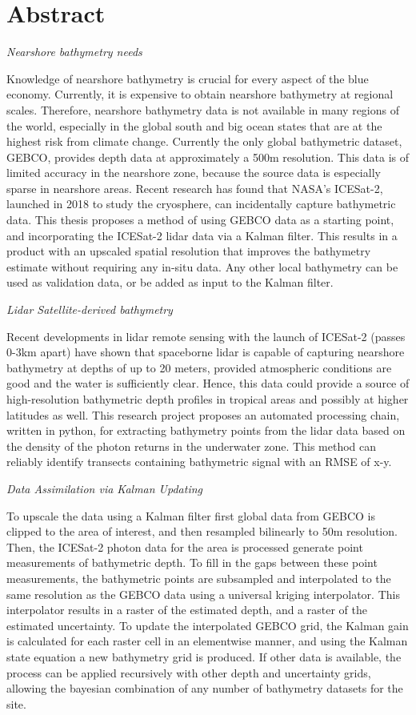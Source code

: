 \chapter*{Abstract}
\noindent\emph{Nearshore bathymetry needs}

Knowledge of nearshore bathymetry is crucial for every aspect of the blue economy. Currently, it is expensive to obtain nearshore bathymetry at regional scales. Therefore, nearshore bathymetry data is not available in many regions of the world, especially in the global south and big ocean states that are at the highest risk from climate change. Currently the only global bathymetric dataset, GEBCO, provides depth data at approximately a 500m resolution. This data is of limited accuracy in the nearshore zone, because the source data is especially sparse in nearshore areas. Recent research has found that NASA's ICESat-2, launched in 2018 to study the cryosphere, can incidentally capture bathymetric data. This thesis proposes a method of using GEBCO data as a starting point, and incorporating the ICESat-2 lidar data via a Kalman filter. This results in a product with an upscaled spatial resolution that improves the bathymetry estimate without requiring any in-situ data. Any other local bathymetry can be used as validation data, or be added as input to the Kalman filter. 

\noindent\emph{Lidar Satellite-derived bathymetry}

Recent developments in lidar remote sensing with the launch of ICESat-2 (passes 0-3km apart) have shown that spaceborne lidar is capable of capturing nearshore bathymetry at depths of up to 20 meters, provided atmospheric conditions are good and the water is sufficiently clear. Hence, this data could provide a source of high-resolution bathymetric depth profiles in tropical areas and possibly at higher latitudes as well. This research project proposes an automated processing chain, written in python, for extracting bathymetry points from the lidar data based on the density of the photon returns in the underwater zone. This method can reliably identify transects containing bathymetric signal with an RMSE of x-y. 


\noindent\emph{Data Assimilation via Kalman Updating}

To upscale the data using a Kalman filter first global data from GEBCO is clipped to the area of interest, and then resampled bilinearly to 50m resolution. Then, the ICESat-2 photon data for the area is processed generate point measurements of bathymetric depth. To fill in the gaps between these point measurements, the bathymetric points are subsampled and interpolated to the same resolution as the GEBCO data using a universal kriging interpolator. This interpolator results in a raster of the estimated depth, and a raster of the estimated uncertainty. To update the interpolated GEBCO grid, the Kalman gain is calculated for each raster cell in an elementwise manner, and using the Kalman state equation a new bathymetry grid is produced. If other data is available, the process can be applied recursively with other depth and uncertainty grids, allowing the bayesian combination of any number of bathymetry datasets for the site.

